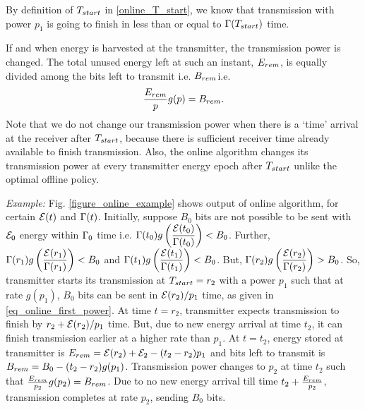 By definition of $T_{\mbox{\scriptsize{start}}}$ in \eqref{online_T_start}, we know that transmission with power $p_1$ is going to finish in less than or equal to  $\TRx(T_{\mbox{\scriptsize{start}}})$ time.

If and when energy is harvested at the transmitter, the transmission power is changed. The total unused energy left at such an instant, $E_{\mbox{\scriptsize{rem}}}$, is equally divided among the bits left to transmit i.e. $B_{\mbox{\scriptsize{rem}}}$i.e. 
\begin{equation}
\frac{E_{\mbox{\scriptsize{rem}}}}{p} g(p)= B_{\mbox{\scriptsize{rem}}}.\end{equation}
Note that we do not change our transmission power when there is a `time' arrival at the receiver after $T_{\mbox{\scriptsize{start}}}$, because there is sufficient receiver time already available to finish transmission. Also, the online algorithm changes its transmission power at every transmitter energy epoch after $T_{\mbox{\scriptsize{start}}}$ unlike the optimal offline policy. 

\textit{Example:} Fig. \ref{figure_online_example} shows output of online algorithm, for certain $\mathcal{E}(t)$ and $\Gamma(t)$. Initially, suppose $B_0$ bits are not possible to be sent with $\mathcal{E}_0$ energy  within $\Gamma_0$ time i.e. $\Gamma(t_0)g\left( \dfrac{\mathcal{E}(t_0)}{\Gamma(t_0)}\right)<B_0$. Further, $\Gamma(r_1)g\left( \dfrac{\mathcal{E}(r_1)}{\Gamma(r_1)}\right)<B_0$ and $\Gamma(t_1)g\left( \dfrac{\mathcal{E}(t_1)}{\Gamma(t_1)}\right)<B_0$. But, $\Gamma(r_2)g\left( \dfrac{\mathcal{E}(r_2)}{\Gamma(r_2)}\right)>B_0$. So, transmitter starts its transmission at $T_{\mbox{\scriptsize{start}}}=r_2$ with a power $p_1$ such that at rate $g(p_1)$, $B_0$ bits can be sent in $\mathcal{E}(r_2)/p_1$ time, as given in \eqref{eq_online_first_power}. At time $t=r_2$, transmitter expects transmission to finish by $r_2+\mathcal{E}(r_2)/p_1$ time. But, due to new energy arrival at time $t_2$, it can finish transmission earlier at a higher rate than $p_1$. At $t=t_2$, energy stored at transmitter is $E_{\mbox{\scriptsize{rem}}}=\ETx(r_2)+\ETx_2-(t_2-r_2)p_1$ and bits left to transmit is $B_{\mbox{\scriptsize{rem}}}=B_0-(t_2-r_2)g(p_1)$. Transmission power changes to $p_2$ at time $t_2$ such that $\frac{E_{\mbox{\scriptsize{rem}}}}{p_2}g(p_2)=B_{\mbox{\scriptsize{rem}}}$. Due to no new energy arrival till time $t_2+\frac{E_{\mbox{\scriptsize{rem}}}}{p_2}$, transmission completes at rate $p_2$, sending $B_0$ bits. 

